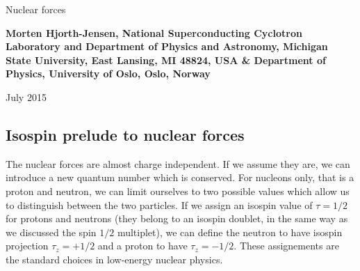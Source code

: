 \documentclass[%
oneside,                 %
final,                   %
10pt]{article}
\begin{document}






\thispagestyle{empty}

\begin{center}
{\LARGE\bf
\begin{spacing}{1.25}
Nuclear forces
\end{spacing}
}
\end{center}


\begin{center}
{\bf Morten Hjorth-Jensen, National Superconducting Cyclotron Laboratory and Department of Physics and Astronomy, Michigan State University, East Lansing, MI 48824, USA {\&} Department of Physics, University of Oslo, Oslo, Norway${}^{}$} \\ [0mm]
\end{center}

\begin{center}
\end{center}
    

\begin{center} %
July 2015
\end{center}

\vspace{1cm}


\subsection*{Isospin prelude to nuclear  forces}
 The nuclear forces are almost charge independent. If we assume they are, 
we can introduce a new quantum number which is conserved. For nucleons only, that is a proton and neutron, we can limit ourselves
to two possible values which allow us to distinguish between the two particles. If we assign an isospin value of $\tau=1/2$ for protons
and neutrons (they belong to an isospin doublet, in the same way as we discussed the spin $1/2$ multiplet), we can define 
the neutron to have isospin projection $\tau_z=+1/2$ and a proton to have $\tau_z=-1/2$. These assignements are the standard choices in low-energy nuclear physics.
\end{document}
